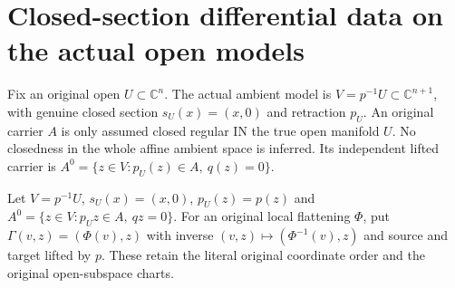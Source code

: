 \chapter{Closed-section differential data on the actual open models}

Fix an original open $U\subset\mathbb C^n$. The actual ambient model is $V=p^{-1}U\subset\mathbb C^{n+1}$, with genuine closed section $s_U(x)=(x,0)$ and retraction $p_U$. An original carrier $A$ is only assumed closed regular IN the true open manifold $U$. No closedness in the whole affine ambient space is inferred. Its independent lifted carrier is $A^0=\{z\in V:p_U(z)\in A,\ q(z)=0\}$.

\begin{definition}
\label{hir:actual-open-zero-section-models}
\leanok
Let $V=p^{-1}U$, $s_U(x)=(x,0)$, $p_U(z)=p(z)$ and $A^0=\{z\in V:p_Uz\in A,\ qz=0\}$. For an original local flattening $\Phi$, put $\Gamma(v,z)=(\Phi(v),z)$ with inverse $(v,z)\mapsto(\Phi^{-1}(v),z)$ and source and target lifted by $p$. These retain the literal original coordinate order and the original open-subspace charts.
\end{definition}


